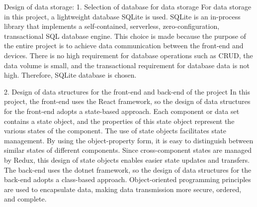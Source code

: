 Design of data storage:
1. Selection of database for data storage
For data storage in this project, a lightweight database SQLite is used.
SQLite is an in-process library that implements a self-contained, serverless, zero-configuration, transactional SQL database engine.
This choice is made because the purpose of the entire project is to achieve data communication between the front-end and devices. There is no high requirement for database operations such as CRUD, the data volume is small, and the transactional requirement for database data is not high. Therefore, SQLite database is chosen.

2. Design of data structures for the front-end and back-end of the project
In this project, the front-end uses the React framework, so the design of data structures for the front-end adopts a state-based approach.
Each component or data set contains a state object, and the properties of this state object represent the various states of the component.
The use of state objects facilitates state management. By using the object-property form, it is easy to distinguish between similar states of different components.
Since cross-component states are managed by Redux, this design of state objects enables easier state updates and transfers.
The back-end uses the dotnet framework, so the design of data structures for the back-end adopts a class-based approach.
Object-oriented programming principles are used to encapsulate data, making data transmission more secure, ordered, and complete.


